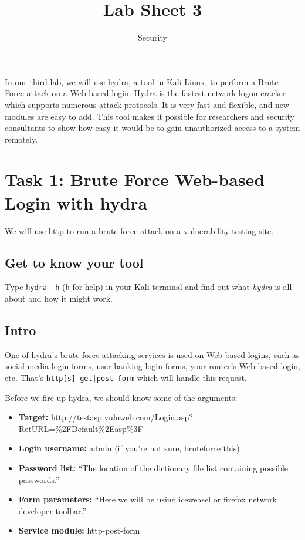 \documentclass{article}
\title{Lab Sheet 3}
\date{Security}
\begin{document}
\maketitle

In our third lab, we will use \href{https://www.cyberpunk.rs/password-cracker-thc-hydra}{hydra}, a tool in Kali Linux, to perform a Brute Force attack on a Web based login. Hydra is the fastest network logon cracker which supports numerous attack protocols. It is very fast and flexible, and new modules are easy to add. This tool makes it possible for researchers and security consultants to show how easy it would be to gain unauthorized access to a system remotely. 

\section{Task 1: Brute Force Web-based Login with hydra}
We will use http to run a brute force attack on a vulnerability testing site.

\subsection{Get to know your tool}
Type \texttt{hydra -h} (\texttt{h} for help) in your Kali terminal and find out what \textit{hydra} is all about and how it might work.

\subsection{Intro}
One of hydra's brute force attacking services is used on Web-based logins, such as social media login forms, user banking login forms, your router's Web-based login, etc. That's \texttt{http[s]-{get|post}-form} which will handle this request.

Before we fire up hydra, we should know some of the arguments:
\begin{itemize}
\item \textbf{Target:} http://testasp.vulnweb.com/Login.asp?RetURL=\%2FDefault\%2Easp\%3F
\item \textbf{Login username:} admin (if you're not sure, bruteforce this)
\item \textbf{Password list:} ``The location of the dictionary file list containing possible passwords.''
\item \textbf{Form parameters:} ``Here we will be using iceweasel or firefox network developer toolbar.''
\item \textbf{Service module:} http-post-form
\end{itemize}
\end{document}
